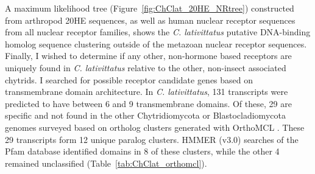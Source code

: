 \indent A maximum likelihood tree (Figure~\ref{fig:ChClat_20HE_NRtree}) constructed from arthropod 20HE sequences, as well as human nuclear receptor sequences from all nuclear receptor families, shows the \textit{C. lativittatus} putative DNA-binding homolog sequence clustering outside of the metazoan nuclear receptor sequences. \\
\indent Finally, I wished to determine if any other, non-hormone based receptors are uniquely found in \textit{C. lativittatus} relative to the other, non-insect associated chytrids. I searched for possible receptor candidate genes based on transmembrane domain architecture. In \textit{C. lativittatus}, 131 transcripts were predicted to have between 6 and 9 transmembrane domains. Of these, 29 are specific and not found in the other Chytridiomycota or Blastocladiomycota genomes surveyed based on ortholog clusters generated with OrthoMCL \cite{Li2003}. These 29 transcripts form 12 unique paralog clusters. HMMER (v3.0) searches of the Pfam database identified domains in 8 of these clusters, while the other 4 remained unclassified (Table~\ref{tab:ChClat_orthomcl}).\\
